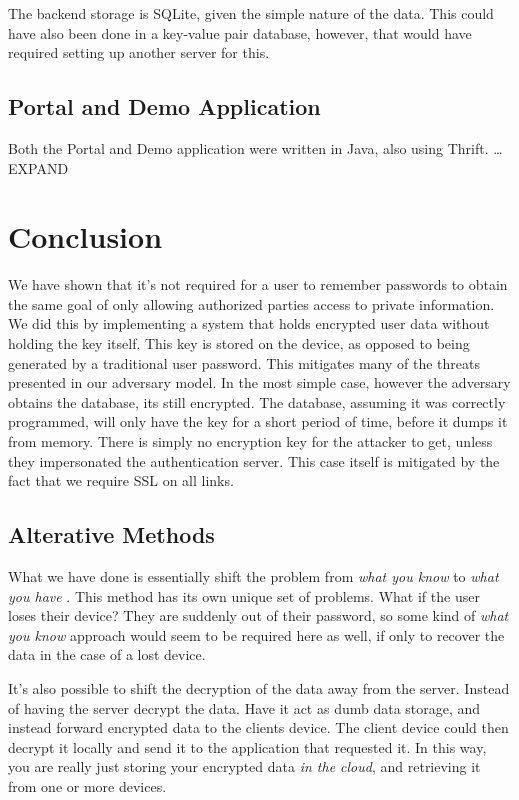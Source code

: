 \documentclass[letterpaper,twocolumn,10pt]{article}
\begin{document}
The backend storage is SQLite, given the simple nature of the data. This could have also been done in a key-value pair database, however, that would have required setting up another server for this.

\subsection{Portal and Demo Application}
Both the Portal and Demo application were written in Java, also using Thrift. \dots EXPAND


\section{Conclusion}
    We have shown that it's not required for a user to remember passwords to obtain the same goal of only allowing authorized parties access to private information. We did this by implementing a system that holds encrypted user data without holding the key itself. This key is stored on the device, as opposed to being generated by a traditional user password. This mitigates many of the threats presented in our adversary model. In the most simple case, however the adversary obtains the database, its still encrypted. The database, assuming it was correctly programmed, will only have the key for a short period of time, before it dumps it from memory. There is simply no encryption key for the attacker to get, unless they impersonated the authentication server. This case itself is mitigated by the fact that we require SSL on all links.

\subsection{Alterative Methods}

What we have done is essentially shift the problem from \textit{what you know} to \textit{what you have} \cite[Chapter~9]{privcomm}. This method has its own unique set of problems. What if the user loses their device? They are suddenly out of their password, so some kind of \textit{what you know} approach would seem to be required here as well, if only to recover the data in the case of a lost device.

It's also possible to shift the decryption of the data away from the server. Instead of having the server decrypt the data. Have it act as dumb data storage, and instead forward encrypted data to the clients device. The client device could then decrypt it locally and send it to the application that requested it. In this way, you are really just storing your encrypted data \textit{in the cloud}, and retrieving it from one or more devices. 



{
    \small
    
    
}
\end{document}
